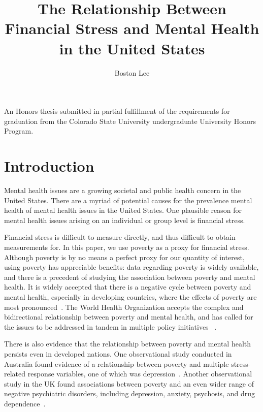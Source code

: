 \documentclass{article}
\title{The Relationship Between Financial Stress and Mental Health in the United States}
\author{Boston Lee}
\begin{document}
\maketitle

\vfill
\begin{center}
\begin{minipage}{30em}
\begin{center}
An Honors thesis submitted in partial fulfillment of the requirements for
graduation from the Colorado State University undergraduate University Honors
Program.
\end{center}
\end{minipage}
\end{center}
\vfill

\pagebreak

\tableofcontents

\pagebreak

\section{Introduction}

Mental health issues are a growing societal and public health concern
in the United States.
There are a myriad of potential causes for the prevalence mental health
of mental health issues in the United States.
One plausible reason for mental health issues arising
on an individual or group level
is financial stress.

Financial stress is difficult to measure directly,
and thus difficult to obtain measurements for.
In this paper, we use poverty as a proxy for financial stress.
Although poverty is by no means a perfect proxy
for our quantity of interest,
using poverty has appreciable benefits:
data regarding poverty is widely available,
and there is a precedent of studying
the association between poverty and mental health.
It is widely accepted that there is a
negative cycle between poverty and mental health,
especially in developing countries,
where the effects of poverty are most pronounced~\cite{lund_2011}.
The World Health Organization accepts
the complex and bidirectional
relationship between poverty and mental health,
and has called for the issues to be addressed
in tandem in multiple policy initiatives~\cite{who_2003} \cite{who_2010}.

There is also evidence that the relationship
between poverty and mental health persists
even in developed nations.
One observational study conducted in Australia
found evidence of a relationship between
poverty and multiple stress-related response variables,
one of which was depression~\cite{saunders_1998}.
Another observational study in the UK found associations
between poverty and an even wider range of negative
psychiatric disorders, including depression,
anxiety, psychosis, and drug dependence~\cite{murali_oyebode_2004}.
\end{document}
